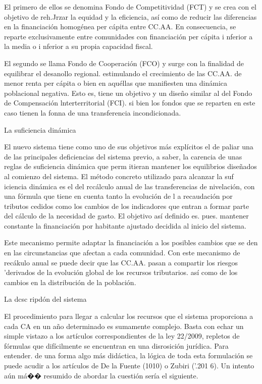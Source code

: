 \documentclass[10pt,a4paper]{article}
\begin{document}
El primero de ellos se denomina Fondo de Competitividad (FCT) y se crea con el objetivo de reh.Jrzar la equidad y la eficiencia, así como de reducir las diferencias en la financiación homogénea per cápita entre CC.AA. En consecuencia, se reparte exclusivamente entre comunidades con financiación per cápita i nferior a la media o i nferior a su propia capacidad fiscal.

El segundo se llama Fondo de Cooperación (FCO) y surge con la finalidad de equilibrar el desanollo regional. estimulando el crecimiento de las CC.AA. de menor renta per cápita o bien en aquéllas que manifiesten una dinámica poblacional negativa. Esto es, tiene un objetivo y un diseño similar al del Fondo de Compensación lnterterritorial (FCI). si bien los fondos que se reparten en este caso tienen la fonna de una transferencia incondicionada.

La suficiencia dinámica

El nuevo sistema tiene como uno de sus objetivos más explícitos el de paliar una de las principales deficiencias del sistema previo, a saber, la carencia de unas reglas de suficiencia dinámica que perm itieran mantener los equilibrios diseñados al comienzo del sistema. El método concreto utilizado para alcanzar la suf iciencia dinámica es el del rccálculo anual de las transferencias de nivelación, con una fórmula que tiene en cuenta tanto la evolución de l a recaudación por tributos cedidos como los cambios de los indicadores que entran a formar parte del cálculo de la necesidad de gasto. El objetivo así definido es. pues. mantener constante la financiación por habitante ajustado decidida al inicio del sistema.

Este mecanismo permite adaptar la financiación a los posibles cambios que se den en las circunstancias que afectan a cada comunidad. Con este mecanismo de recákulo anual se puede decir que las CC.AA. pasan a compartir los riesgos 'derivados de la evolución global de los recursos tributarios. así como de los cambios en la distribución de la población.

La dcsc ripdón del sistema

El procedimiento para llegar a calcular los recursos que el sistema proporciona a cada CA en un año determinado es sumamente complejo. Basta con echar un simple vistazo a los artículos correspondientes de la ley 22/2009, repletos de fórmulas que difícilmente se encuentran en una disrosición jurídica. Para entender. de una forma algo más didáctica, la lógica de toda esta formulación se puede acudir a los artículos de De la Fuente (1010) o Zubiri ('.201 6). Un intento aún má�� resumido de abordar la cuestión sería el siguiente.
\end{document}
